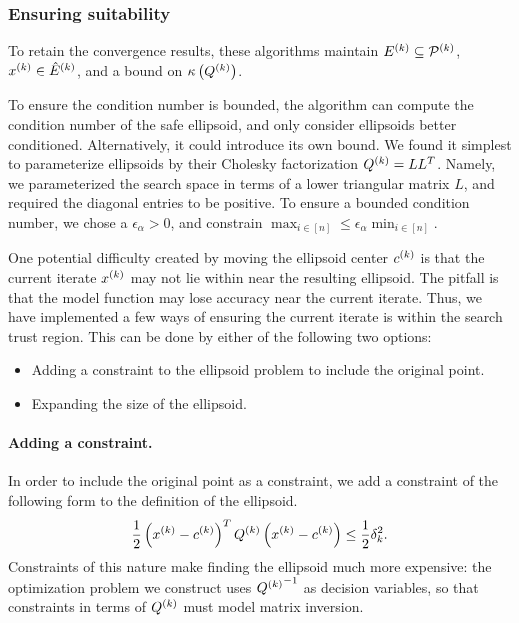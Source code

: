 \documentclass{article}
\begin{document}
\subsubsection{Ensuring suitability}

To retain the convergence results, these algorithms maintain ${E^{(k)}} \subseteq {{\mathcal{P}}^{(k)}}$,
$x^{(k)} \in {{\hat E}^{(k)}} $, and a bound on ${\kappa}\left({Q^{(k)}}\right)$.

To ensure the condition number is bounded, the algorithm can compute the condition number of the safe ellipsoid, and only consider ellipsoids better conditioned.
Alternatively, it could introduce its own bound.
We found it simplest to parameterize ellipsoids by their Cholesky factorization ${Q^{(k)}} = LL^T$.
Namely, we parameterized the search space in terms of a lower triangular matrix $L$, and required the diagonal entries to be positive.
To ensure a bounded condition number, we chose a $\epsilon_{\alpha} > 0$, and constrain  $\max_{i\in[n]} \le \epsilon_{\alpha} \min_{i \in [n]}$.

One potential difficulty created by moving the ellipsoid center $c^{(k)}$ is that the current iterate $x^{(k)}$ may not lie within near the resulting ellipsoid.   
The pitfall is that the model function may lose accuracy near the current iterate.
Thus, we have implemented a few ways of ensuring the current iterate is within the search trust region.
This can be done by either of the following two options:
\begin{itemize}
\item Adding a constraint to the ellipsoid problem to include the original point.
\item Expanding the size of the ellipsoid.
\end{itemize}

\paragraph*{Adding a constraint.}
In order to include the original point as a constraint, we add a constraint of the following form to the definition of the ellipsoid.
\begin{align*}
\frac 1 2 \left(x^{(k)} - c^{(k)}\right)^T{Q^{(k)}}\left(x^{(k)} - c^{(k)}\right) \le \frac 1 2 \delta_k^2.
\end{align*}
Constraints of this nature make finding the ellipsoid much more expensive:
the optimization problem we construct uses ${{Q^{(k)}}}^{-1}$ as decision variables, so that constraints in terms of ${Q^{(k)}}$ must model matrix inversion.
\end{document}
